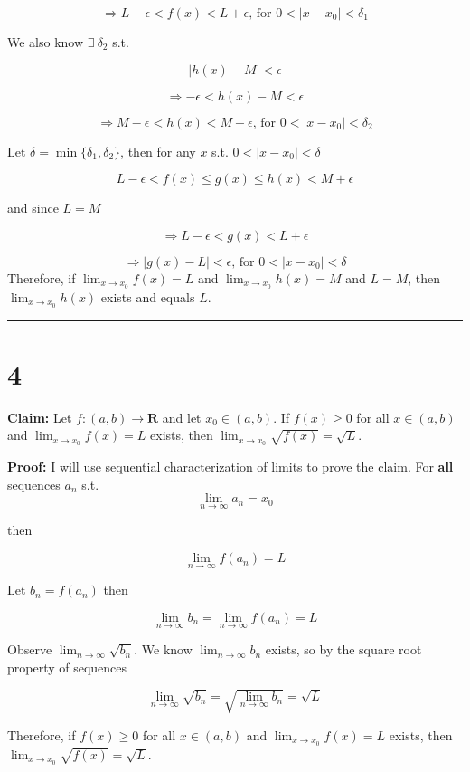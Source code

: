 \documentclass[10pt,letterpaper]{article}
\newcommand\R{\mathbf{R}}
\newcommand\ds{\displaystyle}
\newcommand\qedsym{\hfill \rule{2mm}{2mm}}
\begin{document}
\[\Rightarrow L-\epsilon<f(x)<L+\epsilon\text{, for } 0<|x-x_0|<\delta_1\]

\medskip
We also know $\exists\ \delta_2$ s.t.

\[|h(x)-M|<\epsilon\]

\[\Rightarrow -\epsilon<h(x)-M<\epsilon\]

\[\Rightarrow M-\epsilon<h(x)<M+\epsilon\text{, for } 0<|x-x_0|<\delta_2\]

\medskip
Let $\delta = \min\{\delta_1, \delta_2\}$, then for any $x$ s.t. $0 < |x-x_0| < \delta$

\[L-\epsilon < f(x) \leq g(x) \leq h(x) < M+\epsilon\] 

and since $L=M$

\[\Rightarrow L-\epsilon < g(x) < L+\epsilon\] 

\[\Rightarrow |g(x) - L| < \epsilon\text{, for }0<|x-x_0|<\delta\]
Therefore, if $\ds\lim_{x\to x_0} f(x) = L$ and $\ds\lim_{x\to x_0} h(x) = M$ and $L=M$, then $\ds\lim_{x\to x_0} h(x)$ exists and equals $L$.

\qedsym

\section*{4}

\textbf{Claim:} Let $f:(a, b)\rightarrow\R$ and let $x_0\in(a, b)$. If $f(x) \geq 0$ for all $x\in(a,b)$ and $\ds\lim_{x\to x_0} f(x) = L$ exists, then $\ds\lim_{x\to x_0} \sqrt{f(x)} = \sqrt{L}$.

\medskip

\textbf{Proof:} I will use sequential characterization of limits to prove the claim. For \textbf{all} sequences $a_n$ s.t. \[\ds\lim_{n\to\infty} a_n = x_0\]

then

\[\ds\lim_{n\to\infty}f(a_n) = L\]

Let $b_n = f(a_n)$ then

\[\ds\lim_{n\to\infty}b_n = \ds\lim_{n\to\infty}f(a_n) = L\]

Observe $\ds\lim_{n\to\infty}\sqrt{b_n}$. We know $\ds\lim_{n\to\infty}b_n$ exists, so by the square root property of sequences

\[\ds\lim_{n\to\infty}\sqrt{b_n} = \sqrt{\ds\lim_{n\to\infty}b_n} = \sqrt{L}\]

Therefore, if $f(x) \geq 0$ for all $x\in(a,b)$ and $\ds\lim_{x\to x_0} f(x) = L$ exists, then $\ds\lim_{x\to x_0} \sqrt{f(x)} = \sqrt{L}$.
\end{document}
